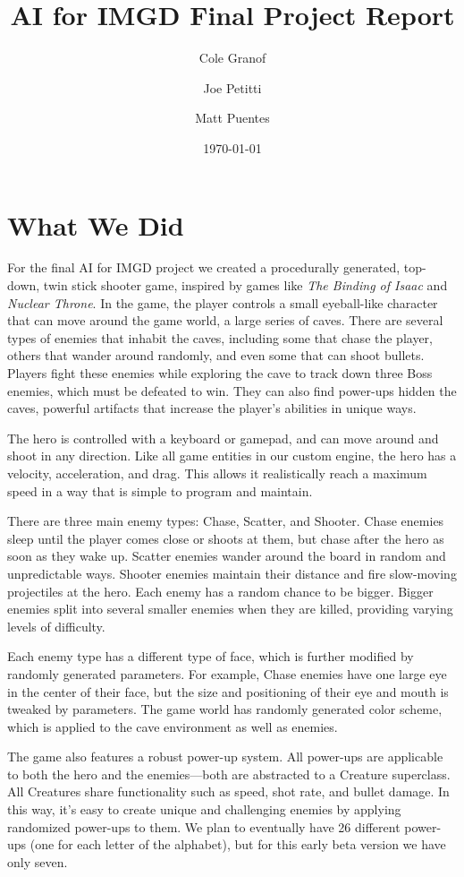 \documentclass[a4paper, 12pt]{article}
\title{AI for IMGD Final Project Report}
\author{Cole Granof \and Joe Petitti \and Matt Puentes}
\date{\today}
\begin{document}
\maketitle

\section{What We Did}

For the final AI for IMGD project we created a procedurally generated, top-down,
twin stick shooter game, inspired by games like \textit{The Binding of Isaac}
and \textit{Nuclear Throne}. In the game, the player controls a small
eyeball-like character that can move around the game world, a large series of
caves. There are several types of enemies that inhabit the caves, including some
that chase the player, others that wander around randomly, and even some that
can shoot bullets. Players fight these enemies while exploring the cave to track
down three Boss enemies, which must be defeated to win. They can also find
power-ups hidden the caves, powerful artifacts that increase the player's
abilities in unique ways.

The hero is controlled with a keyboard or gamepad, and can move around and shoot
in any direction. Like all game entities in our custom engine, the hero has a
velocity, acceleration, and drag. This allows it realistically reach a maximum
speed in a way that is simple to program and maintain.

There are three main enemy types: Chase, Scatter, and Shooter. Chase enemies
sleep until the player comes close or shoots at them, but chase after the hero
as soon as they wake up. Scatter enemies wander around the board in random and
unpredictable ways. Shooter enemies maintain their distance and fire slow-moving
projectiles at the hero. Each enemy has a random chance to be bigger. Bigger
enemies split into several smaller enemies when they are killed, providing
varying levels of difficulty.

Each enemy type has a different type of face, which is further modified by
randomly generated parameters. For example, Chase enemies have one large eye in
the center of their face, but the size and positioning of their eye and mouth is
tweaked by parameters. The game world has randomly generated color scheme, which
is applied to the cave environment as well as enemies.

The game also features a robust power-up system. All power-ups are applicable to
both the hero and the enemies---both are abstracted to a Creature superclass.
All Creatures share functionality such as speed, shot rate, and bullet damage.
In this way, it's easy to create unique and challenging enemies by applying
randomized power-ups to them. We plan to eventually have 26 different power-ups
(one for each letter of the alphabet), but for this early beta version we have
only seven.
\end{document}
